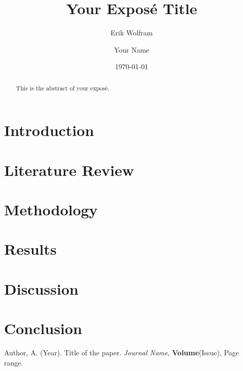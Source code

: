 \documentclass[12pt,a4paper]{article}
\author[]{Erik Wolfram}
\title{Your Exposé Title}
\author{Your Name}
\date{\today}
\begin{document}
\maketitle

\begin{abstract}
    This is the abstract of your exposé.
\end{abstract}

\tableofcontents

\section{Introduction}
\lipsum[1-3] %

\section{Literature Review}
\lipsum[4-6] %

\section{Methodology}
\lipsum[7-9] %

\section{Results}
\lipsum[10-12] %

\section{Discussion}
\lipsum[13-15] %

\section{Conclusion}
\lipsum[16] %

\begin{thebibliography}{9}
    Author, A. (Year). Title of the paper. \textit{Journal Name}, \textbf{Volume}(Issue), Page range.
\end{thebibliography}
\end{document}
